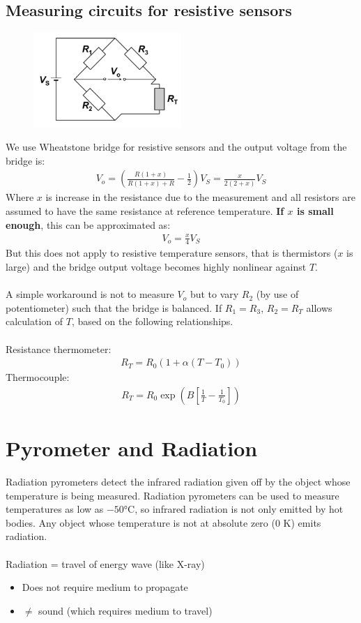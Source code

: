 \documentclass[class=report, crop=false, 12pt,a4paper]{standalone}
\begin{document}
\subsection{Measuring circuits for resistive sensors}
\begin{figure}[H]
  \centering
  \includegraphics[width = 0.5\textwidth]{../img/Mdiagram71.png}
\end{figure}
We use Wheatstone bridge for resistive sensors and the output voltage from the bridge is:
\begin{gather}
  V_o = \left(\frac{R(1+x)}{R(1+x)+R}-\frac{1}{2}\right)V_S = \frac{x}{2(2+x)}V_S
\end{gather}
Where $x$ is increase in the resistance due to the measurement and all resistors are assumed to have the same resistance at reference temperature. \textbf{If $x$ is small enough}, this can be approximated as:
\begin{gather}
  V_o = \frac{x}{4}V_S
\end{gather}
But this does not apply to resistive temperature sensors, that is thermistors ($x$ is large) and the bridge output voltage becomes highly nonlinear against $T$. \\\\
A simple workaround is not to measure $V_o$ but to vary $R_2$ (by use of potentiometer) such that the bridge is balanced. If $R_1 = R_3$, $R_2 = R_T$ allows calculation of $T$, based on the following relationships. \\\\
Resistance thermometer:
\begin{gather}
  R_T = R_0(1+\alpha(T-T_0))
\end{gather}
Thermocouple:
\begin{gather}
  R_T = R_0\exp\left(B\left[\frac{1}{T}-\frac{1}{T_0}\right]\right)
\end{gather}
\section{Pyrometer and Radiation}
Radiation pyrometers detect the infrared radiation given off by the object whose temperature is being measured. Radiation pyrometers can be used to measure temperatures as low as $\ang{-50}$C, so infrared radiation is not only emitted by hot bodies. Any object whose temperature is not at absolute zero (0 K) emits radiation. \\\\
Radiation = travel of energy wave (like X-ray)
\begin{itemize}
  \item Does not require medium to propagate
  \item $\neq$ sound (which requires medium to travel)
\end{itemize}
\end{document}
